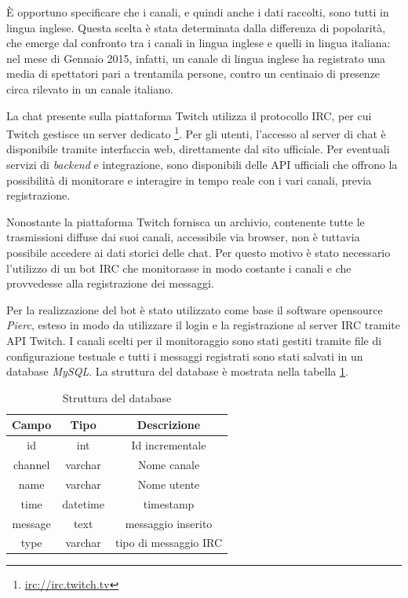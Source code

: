 \documentclass[a4paper,12pt,openright,twoside]{report}
\theoremstyle{definition}
\begin{document}
È opportuno specificare che i canali, e quindi anche i dati raccolti, 
sono tutti in lingua inglese. Questa scelta è stata determinata dalla 
differenza di popolarità, che emerge dal confronto tra i canali in lingua 
inglese e quelli in lingua italiana:
nel mese di Gennaio 2015, infatti, un canale di lingua inglese ha registrato una 
media di spettatori pari a trentamila persone, 
contro un centinaio di presenze circa rilevato in un canale italiano.

La chat presente sulla piattaforma Twitch utilizza il protocollo IRC, 
per cui Twitch gestisce un server dedicato \footnote{\url{irc://irc.twitch.tv}}. 
Per gli utenti, l’accesso al server di chat è disponibile tramite interfaccia web, 
direttamente dal sito ufficiale. Per eventuali servizi di \emph{backend}
e integrazione, sono disponibili 
delle API ufficiali che offrono la possibilità di monitorare e interagire in tempo reale 
con i vari canali, previa registrazione.

Nonostante la piattaforma Twitch fornisca un archivio, contenente tutte le trasmissioni diffuse dai suoi canali, 
accessibile via browser, non è tuttavia possibile accedere ai dati storici delle chat.
Per questo motivo è stato necessario l’utilizzo di un bot IRC che monitorasse in 
modo costante i canali e che provvedesse alla registrazione dei messaggi.

Per la realizzazione del bot è stato utilizzato come base il software opensource \emph{Pierc},
esteso in modo da utilizzare il login e la registrazione 
al server IRC tramite API Twitch. I canali scelti per il monitoraggio sono stati 
gestiti tramite file di configurazione testuale e tutti i messaggi registrati sono stati salvati 
in un database \emph{MySQL}. La struttura del database è mostrata nella tabella \ref{tab:strutturaDB}.

\begin{table}[h]
	\centering
	\begin{tabular}{|c|c|c|}
		\hline
		\textbf{Campo} &\textbf{ Tipo} & \textbf{Descrizione} \\
		\hline
		\hline
		id & int & Id incrementale \\
		\hline
		channel & varchar & Nome canale \\
		\hline
		name & varchar & Nome utente \\
		\hline
		time & datetime & timestamp \\
		\hline
		message & text & messaggio inserito \\
		\hline
		type & varchar & tipo di messaggio IRC \\
		\hline
	\end{tabular}
	\caption{Struttura del database}
	\label{tab:strutturaDB}
\end{table}
\end{document}
